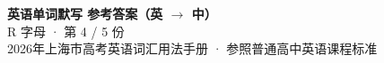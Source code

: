 \documentclass[10pt,a4paper]{article}
\begin{document}
\pagestyle{plain}

\begin{center}
{\LARGE\bfseries 英语单词默写 \quad 参考答案（英 $\to$ 中）}\\[0.22em]
{\large R 字母 · 第 4 / 5 份}\\[0.18em]
{\small 2026年上海市高考英语词汇用法手册 · 参照普通高中英语课程标准}
\end{center}

\vspace{0.2em}
\noindent{\color{rulegray}\rule{\textwidth}{0.8pt}}

\vspace{0.35em}

\vspace{0.25em}
\renewcommand{\arraystretch}{1.32}
\end{document}
